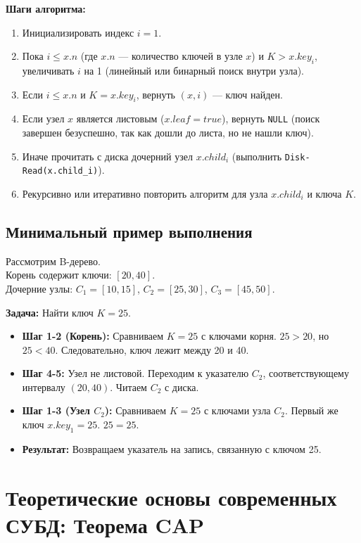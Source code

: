 \documentclass[12pt, a4paper]{article}
\begin{document}
\textbf{Шаги алгоритма:}
\begin{enumerate}[label=\arabic*.]
    \item Инициализировать индекс $i = 1$.
    \item Пока $i \le x.n$ (где $x.n$ — количество ключей в узле $x$) и $K > x.key_i$, увеличивать $i$ на 1 (линейный или бинарный поиск внутри узла).
    \item Если $i \le x.n$ и $K = x.key_i$, вернуть $(x, i)$ --- ключ найден.
    \item Если узел $x$ является листовым ($x.leaf = true$), вернуть \texttt{NULL} (поиск завершен безуспешно, так как дошли до листа, но не нашли ключ).
    \item Иначе прочитать с диска дочерний узел $x.child_i$ (выполнить \texttt{Disk-Read(x.child\_i)}).
    \item Рекурсивно или итеративно повторить алгоритм для узла $x.child_i$ и ключа $K$.
\end{enumerate}

\subsection*{Минимальный пример выполнения}
Рассмотрим B-дерево. \\
Корень содержит ключи: $[20, 40]$.\\
Дочерние узлы: $C_1 = [10, 15]$, $C_2 = [25, 30]$, $C_3 = [45, 50]$.

\textbf{Задача:} Найти ключ $K = 25$.
\begin{itemize}
    \item \textbf{Шаг 1-2 (Корень):} Сравниваем $K=25$ с ключами корня. $25 > 20$, но $25 < 40$. Следовательно, ключ лежит между 20 и 40.
    \item \textbf{Шаг 4-5:} Узел не листовой. Переходим к указателю $C_2$, соответствующему интервалу $(20, 40)$. Читаем $C_2$ с диска.
    \item \textbf{Шаг 1-3 (Узел $C_2$):} Сравниваем $K=25$ с ключами узла $C_2$. Первый же ключ $x.key_1 = 25$. $25 = 25$.
    \item \textbf{Результат:} Возвращаем указатель на запись, связанную с ключом 25.
\end{itemize}

\section{Теоретические основы современных СУБД: Теорема CAP}
\end{document}
